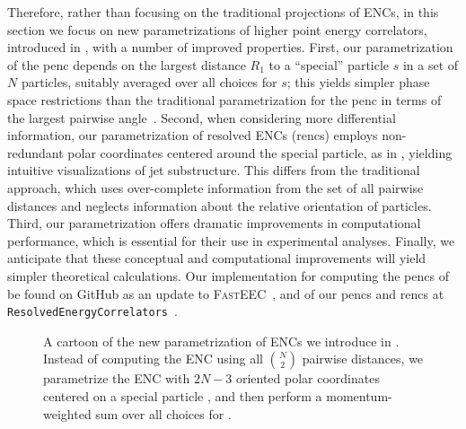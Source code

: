 Therefore, rather than focusing on the traditional projections of ENCs, in this section we focus on new parametrizations of higher point energy correlators, introduced in , with a number of improved properties.
%
First, our parametrization of the \gls{penc} depends on the largest distance \(R_1\) to a ``special'' particle $s$ in a set of $N$ particles, suitably averaged over all choices for $s$;
%
this yields simpler phase space restrictions than the traditional parametrization for the \gls{penc} in terms of the largest pairwise angle~\cite{Chen:2020vvp}.
%
Second, when considering more differential information, our parametrization of resolved ENCs (\gls{renc}s) employs non-redundant polar coordinates centered around the special particle, as in , yielding intuitive visualizations of jet substructure.
%
This differs from the traditional approach, which uses over-complete information from the set of all pairwise distances and neglects information about the relative orientation of particles.
%
Third, our parametrization offers dramatic improvements in computational performance, which is essential for their use in experimental analyses.
%
Finally, we anticipate that these conceptual and computational improvements will yield simpler theoretical calculations.
%
Our implementation for computing the \glspl{penc} of  be found on GitHub as an update to \textsc{FastEEC}~\cite{Budhraja:2024xiq}, and of our \glspl{penc} and \gls{renc}s at \texttt{ResolvedEnergyCorrelators}~\cite{github:RENC}.


\begin{figure}
    \centering
    \scalebox{1.2}{
        
    }
    \caption[Cartoon of the new parametrization of ENCs introduced by the author and collaborators]{
        A cartoon of the new parametrization of ENCs we introduce in .
        Instead of computing the ENC using all \(\binom{N}{2}\) pairwise distances, we parametrize the ENC with \(2N - 3\) oriented polar coordinates centered on a special particle \izero{}, and then perform a momentum-weighted sum over all choices for \izero{}.
    }
	\label{fig:cartoon}
\end{figure}


